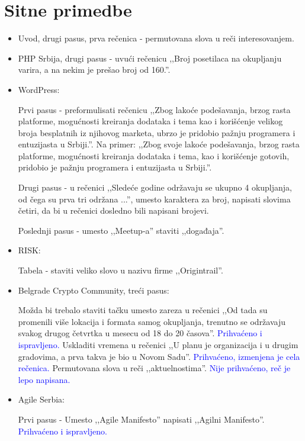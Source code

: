 \documentclass[a4paper]{report}
\newcommand{\odgovor}[1]{\textcolor{blue}{#1}}
\begin{document}
\section{Sitne primedbe}
\begin{itemize}
    \item Uvod, drugi pasus, prva rečenica - permutovana slova u reči interesovanjem.
    \item PHP Srbija, drugi pasus - uvući rečenicu ,,Broj posetilaca na okupljanju varira, a na nekim je prešao broj od 160.''.
    \item WordPress:
    
    Prvi pasus - preformulisati rečenicu ,,Zbog lakoće podešavanja, brzog rasta platforme, mogućnosti kreiranja dodataka i tema kao i korišćenje velikog broja besplatnih iz njihovog marketa, ubrzo je pridobio pažnju programera i entuzijasta u Srbiji.''. Na primer: ,,Zbog svoje lakoće podešavanja, brzog rasta platforme, mogućnosti kreiranja dodataka i tema, kao i korišćenje gotovih, pridobio je pažnju programera i  entuzijasta u Srbiji.''.
    
    Drugi pasus - u rečenici ,,Sledeće godine održavaju se ukupno 4 okupljanja, od čega su prva tri održana ...'', umesto karaktera za broj, napisati slovima četiri, da bi u rečenici dosledno bili napisani brojevi.
    
     Poslednji pasus - umesto ,,Meetup-a'' staviti ,,događaja''.
    \item RISK:
    
    Tabela - staviti veliko slovo u nazivu firme ,,Origintrail''.
    
    \item Belgrade Crypto Community, treći pasus:
    
    Možda bi trebalo staviti tačku umesto zareza u rečenici ,,Od tada su promenili više lokacija i formata samog okupljanja, trenutno se održavaju svakog drugog četvrtka u mesecu od 18 do 20 časova''.
    \odgovor{Prihvaćeno i ispravljeno.}
    Uskladiti vremena u rečenici ,,U planu je organizacija i u drugim gradovima, a prva takva je bio u Novom Sadu''.
    \odgovor{Prihvaćeno, izmenjena je cela rečenica.}
    Permutovana slova u reči ,,aktuelnostima''.
    \odgovor{Nije prihvaćeno, reč je lepo napisana. }
    \item Agile Serbia:
    
    Prvi pasus - Umesto ,,Agile Manifesto'' napisati ,,Agilni Manifesto''.
    \odgovor{Prihvaćeno i ispravljeno.}
    

\end{itemize}
\end{document}
